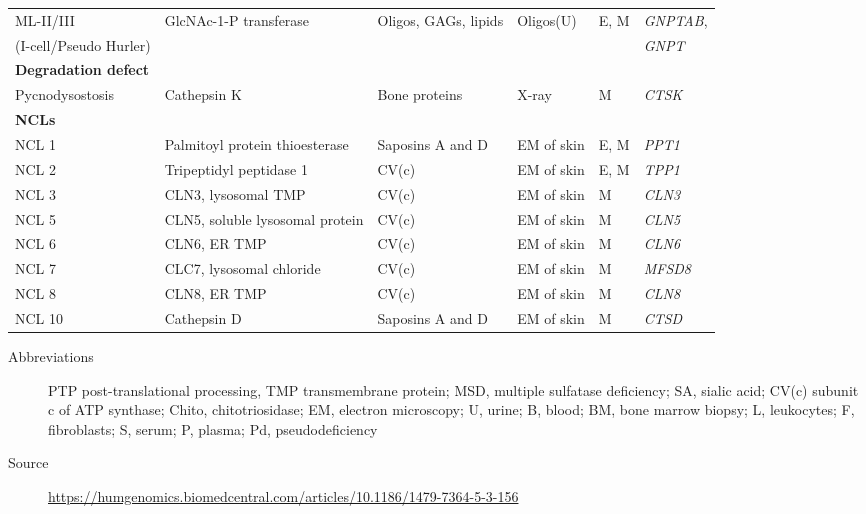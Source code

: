 \documentclass[landscape]{article}
\begin{document}
\begin{longtable}{llllll}
ML-II/III & GlcNAc-1-P transferase & Oligos, GAGs, lipids & Oligos(U) & E\footnotemark, M & \emph{GNPTAB},\\
(I-cell/Pseudo Hurler) &  &  &  &  & \emph{GNPT}\\
\hline
\textbf{Degradation defect} &  &  &  &  & \\
Pycnodysostosis & Cathepsin K & Bone proteins & X-ray & M & \emph{CTSK}\\
\hline
\textbf{NCLs} &  &  &  &  & \\
NCL 1 & Palmitoyl protein thioesterase & Saposins A and D & EM of skin & E, M & \emph{PPT1}\\
NCL 2 & Tripeptidyl peptidase 1 & CV(c) & EM of skin & E, M & \emph{TPP1}\\
NCL 3 & CLN3, lysosomal TMP & CV(c) & EM of skin & M & \emph{CLN3}\\
NCL 5 & CLN5, soluble lysosomal protein & CV(c) & EM of skin & M & \emph{CLN5}\\
NCL 6 & CLN6, ER TMP & CV(c) & EM of skin & M & \emph{CLN6}\\
NCL 7 & CLC7, lysosomal chloride & CV(c) & EM of skin & M & \emph{MFSD8}\\
NCL 8 & CLN8, ER TMP & CV(c) & EM of skin & M & \emph{CLN8}\\
NCL 10 & Cathepsin D & Saposins A and D & EM of skin & M & \emph{CTSD}\\
\end{longtable}

\begin{description}
\item[{Abbreviations}] PTP post-translational processing, TMP
transmembrane protein; MSD, multiple sulfatase deficiency; SA,
sialic acid; CV(c) subunit c of ATP synthase; Chito,
chitotriosidase; EM, electron microscopy; U, urine; B, blood; BM,
bone marrow biopsy; L, leukocytes; F, fibroblasts; S, serum; P,
plasma; Pd, pseudodeficiency
\item[{Source}] \url{https://humgenomics.biomedcentral.com/articles/10.1186/1479-7364-5-3-156}
\end{description}
\end{document}
